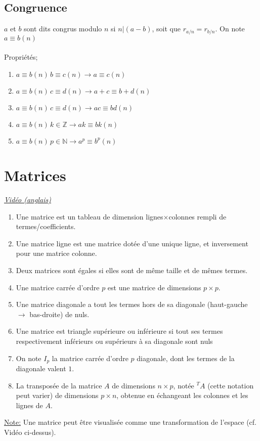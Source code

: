 \documentclass{article}
\begin{document}
\subsection{Congruence}
$a$ et $b$ sont dits congrus modulo $n$ si $n|(a-b)$, soit que $r_{a/n}=r_{b/n}$. On note $a\equiv b (n)$
\\\\Propriétés;
\begin{enumerate}
	\item $a \equiv b(n)\,b\equiv c(n) \rightarrow a\equiv c(n)$
	\item $a \equiv b(n)\,c \equiv d(n) \rightarrow a+c\equiv b+d(n)$
	\item $a \equiv b(n)\,c \equiv d(n) \rightarrow ac\equiv bd(n)$
	\item $a \equiv b(n)\,k\in\mathbb{Z} \rightarrow ak\equiv bk(n)$
	\item $a \equiv b(n)\,p\in\mathbb{N} \rightarrow a^p\equiv b^p(n)$
\end{enumerate}


\section{Matrices}
\href{https://youtu.be/kYB8IZa5AuEl}{\underline{\textit{Vidéo (anglais)}}}\\
\break
\begin{enumerate}
	\item Une matrice est un tableau de dimension lignes$\times$colonnes rempli de termes/coefficients.
	\item Une matrice ligne est une matrice dotée d'une unique ligne, et inversement pour une matrice colonne.
	\item Deux matrices sont égales si elles sont de même taille et de mêmes termes.
	\item Une matrice carrée d'ordre $p$ est une matrice de dimensions $p\times p$.
	\item Une matrice diagonale a tout les termes hors de sa diagonale (haut-gauche $\rightarrow$ bas-droite) de nuls.
	\item Une matrice est triangle supérieure ou inférieure si tout ses termes respectivement inférieurs ou supérieurs à sa diagonale sont nuls
	\item On note $I_p$ la matrice carrée d'ordre $p$ diagonale, dont les termes de la diagonale valent $1$.
	\item La transposée de la matrice $A$ de dimensions $n\times p$, notée $^TA$ (cette notation peut varier) de dimensions $p\times n$, obtenue en échangeant les colonnes et les lignes de $A$.
\end{enumerate}
\underline{Note:} Une matrice peut être visualisée comme une transformation de l'espace (cf. Vidéo ci-dessus).
\end{document}
